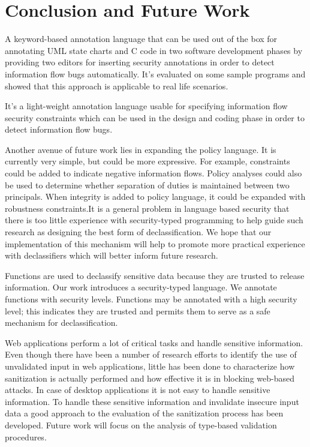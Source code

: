 \chapter{Conclusion and Future Work}

A keyword-based annotation language that can be used out of the box for annotating UML state charts and C code in two software development phases by providing two editors for inserting security annotations in order to detect information flow bugs automatically. It's evaluated on some sample programs and showed that this approach is applicable to real life scenarios.

It's a light-weight annotation language usable for specifying
information flow security constraints which can be used in the
design and coding phase in order to detect information flow
bugs.

Another avenue of future work lies in expanding the policy
language. It is currently very simple, but could be more expressive.
For example, constraints could be added to indicate negative information flows. Policy analyses could also be used to determine
whether separation of duties is maintained between two principals.
When integrity is added to policy language, it could be expanded with robustness constraints.It is a general problem in language based security that there is too little experience with security-typed
programming to help guide such research as designing the best
form of declassification. We hope that our implementation of this
mechanism will help to promote more practical experience
with declassifiers which will better inform future research.

Functions are used to declassify sensitive data because they are trusted to release information. Our work introduces a security-typed language. We annotate functions with security levels. Functions may be annotated with a high security level; this indicates they are trusted and permits them to serve as a safe mechanism for declassification.

Web applications perform a lot of critical tasks and
handle sensitive information. Even though there have been
a number of research efforts to identify the use of unvalidated input in web applications, little has been done
to characterize how sanitization is actually performed and
how effective it is in blocking web-based attacks. In case of desktop applications it is not easy to handle sensitive information. To handle these sensitive information and invalidate insecure input data a good approach to the evaluation of the sanitization process has been developed. Future work will focus on the analysis of type-based validation procedures.

